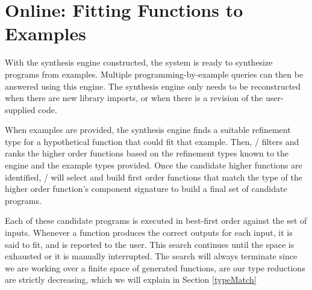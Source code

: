 \section{Online: Fitting Functions to Examples} \label{synth}

With the synthesis engine constructed, the system is ready to synthesize programs from examples.
Multiple programming-by-example queries can then be answered using this engine.
The synthesis engine only needs to be reconstructed when there are new library imports, or when there is a revision of the user-supplied code.

When examples are provided, the synthesis engine finds a suitable refinement type for a hypothetical function that could fit that example.
Then, \ourTool/ filters and ranks the higher order functions based on the refinement types known to the engine and the example types provided.
Once the candidate higher functions are identified, \ourTool/ will select and build first order functions that match the type of the higher order function's component signature to build a final set of candidate programs.

Each of these candidate programs is executed in best-first order against the set of inputs.
Whenever a function produces the correct outputs for each input, it is said to fit, and is reported to the user.
This search continues until the space is exhausted or it is manually interrupted.
The search will always terminate since we are working over a finite space of generated functions, are our type reductions are strictly decreasing, which we will explain in Section \ref{typeMatch}






